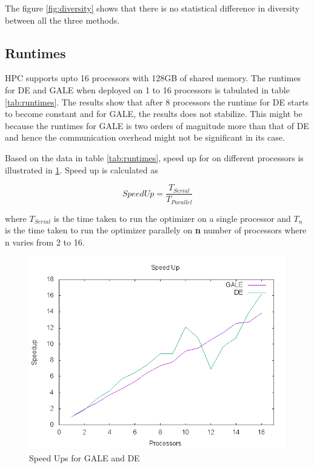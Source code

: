 \documentclass[conference]{IEEEtran}
\begin{document}
	The figure \ref{fig:diversity} shows that there is no statistical difference in diversity between all the three methods.
	
	\subsection{Runtimes}
	
	HPC supports upto 16 processors with 128GB of shared memory. The runtimes for DE and GALE when deployed on 1 to 16 processors is tabulated in table \ref{tab:runtimes}. The results show that after 8 processors the runtime for DE starts to become constant and for GALE, the results does not stabilize. This might be because the runtimes for GALE is two orders of magnitude more than that of DE and hence the communication overhead might not be significant in its case.
	
	Based on the data in table \ref{tab:runtimes}, speed up for on different processors is illustrated in \ref{fig:speedups}. Speed up is calculated as
	
	\[SpeedUp = \frac{{T}_{Serial}}{{T}_{Parallel}} \]
	
	where ${T}_{Serial}$ is the time taken to run the optimizer on a single processor and ${T}_{n}$ is the time taken to run the optimizer parallely on \textbf{n} number of processors where n varies from 2 to 16.
	
	
	\begin{figure}[h]
		\begin{mdframed}
			\includegraphics[width=\linewidth]{img/speedups}
		\end{mdframed}
		\caption{Speed Ups for GALE and DE}	
		\label{fig:speedups}
	\end{figure}
	
\end{document}
